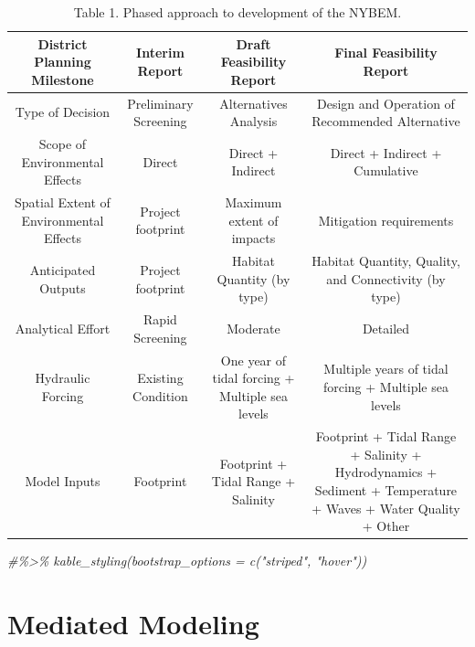 \documentclass[
]{book}
\newenvironment{Shaded}{\begin{snugshade}}{\end{snugshade}}
\newcommand{\CommentTok}[1]{\textcolor[rgb]{0.56,0.35,0.01}{\textit{#1}}}
\begin{document}
\begin{table}

\caption{\label{tab:unnamed-chunk-2}Table 1. Phased approach to development of the NYBEM.}
\centering
\begin{tabular}[t]{c|c|c|c}
\hline
District Planning Milestone & Interim Report & Draft Feasibility Report & Final Feasibility Report\\
\hline
Type of Decision & Preliminary Screening & Alternatives Analysis & Design and Operation of Recommended Alternative\\
\hline
Scope of Environmental Effects & Direct & Direct + Indirect & Direct + Indirect + Cumulative\\
\hline
Spatial Extent of Environmental Effects & Project footprint & Maximum extent of impacts & Mitigation requirements\\
\hline
Anticipated Outputs & Project footprint & Habitat Quantity (by type) & Habitat Quantity, Quality, and Connectivity (by type)\\
\hline
Analytical Effort & Rapid Screening & Moderate & Detailed\\
\hline
Hydraulic Forcing & Existing Condition & One year of tidal forcing + Multiple sea levels & Multiple years of tidal forcing + Multiple sea levels\\
\hline
Model Inputs & Footprint & Footprint + Tidal Range + Salinity & Footprint + Tidal Range + Salinity + Hydrodynamics + Sediment + Temperature + Waves + Water Quality + Other\\
\hline
\end{tabular}
\end{table}

\begin{Shaded}
\begin{Highlighting}[]
\CommentTok{\#\%\textgreater{}\% kable\_styling(bootstrap\_options = c("striped", "hover")) }
\end{Highlighting}
\end{Shaded}

\hypertarget{mediated-modeling}{%
\section{Mediated Modeling}\label{mediated-modeling}}
\end{document}
